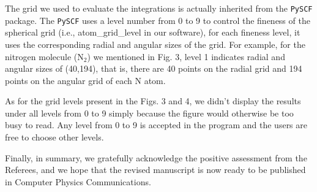\documentclass[a4paper,11pt]{article}
\begin{document}
\vspace{1em}

The grid we used to evaluate the integrations is actually inherited from the \texttt{PySCF} package.
The \texttt{PySCF} uses a level number from 0 to 9 to control the fineness of the spherical grid (i.e., atom\_grid\_level in our software),
for each fineness level, it uses the corresponding radial and angular sizes of the grid.
For example, for the nitrogen molecule (N$_2$) we mentioned in Fig. 3, level 1 indicates radial and angular sizes of (40,194), that is, there are 40 points on the radial grid and 194 points on the angular grid of each N atom.

As for the grid levels present in the Figs. 3 and 4, we didn't display the results under all levels from 0 to 9 simply because the figure would otherwise be too busy to read.
Any level from 0 to 9 is accepted in the program and the users are free to choose other levels.


\vspace{5em}

Finally, in summary, we gratefully acknowledge the positive assessment from the Referees, and we hope that the revised manuscript is now ready to be published in Computer Physics Communications.
\end{document}
